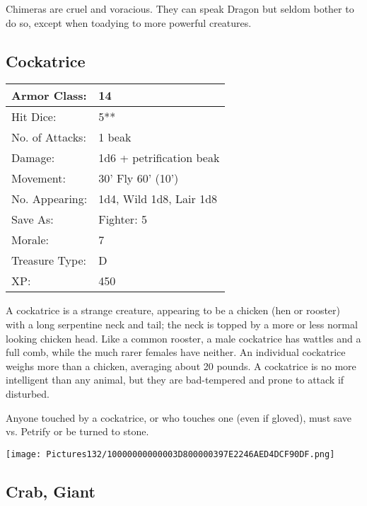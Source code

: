 \documentclass[a4paper,twoside,openany,10pt]{book}
\begin{document}
\begin{multicols}{2}
Chimeras are cruel and voracious. They can speak Dragon but seldom bother to do so, except when toadying to more powerful creatures.

\subsection*{Cockatrice}\label{cockatrice}


\begin{tabularx}{0.48\textwidth}{@{}lX@{}}
Armor Class: & 14 \\\hline
Hit Dice: & 5** \\\hline
No. of Attacks: & 1 beak \\\hline
Damage: & 1d6 + petrification beak \\\hline
Movement: & 30' Fly 60'
(10') \\\hline
No. Appearing: & 1d4, Wild 1d8, Lair 1d8 \\\hline
Save As: & Fighter: 5 \\\hline
Morale: & 7 \\\hline
Treasure Type: & D \\\hline
XP: & 450 \\\hline
\end{tabularx}\medskip

A cockatrice is a strange creature, appearing to be a chicken (hen or rooster) with a long serpentine neck and tail; the neck is topped by a more or less normal looking chicken head. Like a common rooster, a male cockatrice has wattles and a full comb, while the much rarer females have neither. An individual cockatrice weighs more than a chicken, averaging about 20 pounds. A cockatrice is no more intelligent than any animal, but they are bad-tempered and prone to attack if disturbed.

Anyone touched by a cockatrice, or who touches one (even if gloved), must save vs. Petrify or be turned to stone.

\begin{center}
	\texttt{[image: Pictures132/10000000000003D800000397E2246AED4DCF90DF.png]}
\end{center}


\subsection*{Crab, Giant}\label{crab-giant}


\end{multicols}
\end{document}

